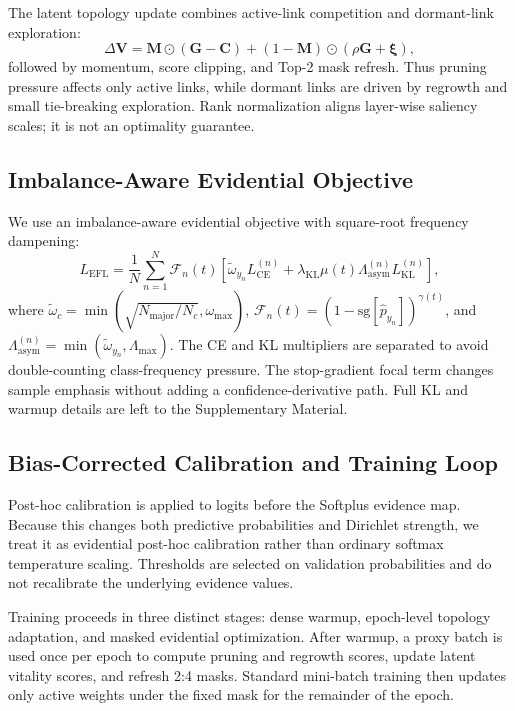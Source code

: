 \documentclass[letterpaper]{article} %
\begin{document}
The latent topology update combines active-link competition and dormant-link exploration:
\begin{equation}
    \Delta\bm{V}=\bm{M}\odot(\bm{G}-\bm{C})+(1-\bm{M})\odot(\rho\bm{G}+\bm{\xi}),
\end{equation}
followed by momentum, score clipping, and Top-2 mask refresh. Thus pruning pressure affects only active links, while dormant links are driven by regrowth and small tie-breaking exploration. Rank normalization aligns layer-wise saliency scales; it is not an optimality guarantee.

\subsection{Imbalance-Aware Evidential Objective}
We use an imbalance-aware evidential objective with square-root frequency dampening:
\begin{equation}
L_{\mathrm{EFL}}=\frac{1}{N}\sum_{n=1}^N\mathcal{F}_n(t)
\left[
\tilde{\omega}_{y_n}L_{\mathrm{CE}}^{(n)}
+\lambda_{\mathrm{KL}}\mu(t)\Lambda_{\mathrm{asym}}^{(n)}L_{\mathrm{KL}}^{(n)}
\right],
\end{equation}
where $\tilde{\omega}_{c}=\min(\sqrt{N_{\mathrm{major}}/N_c},\omega_{\max})$, $\mathcal{F}_n(t)=(1-\mathrm{sg}[\hat p_{y_n}])^{\gamma(t)}$, and $\Lambda_{\mathrm{asym}}^{(n)}=\min(\tilde{\omega}_{y_n},\Lambda_{\max})$. The CE and KL multipliers are separated to avoid double-counting class-frequency pressure. The stop-gradient focal term changes sample emphasis without adding a confidence-derivative path. Full KL and warmup details are left to the Supplementary Material.

\subsection{Bias-Corrected Calibration and Training Loop}
Post-hoc calibration is applied to logits before the Softplus evidence map. Because this changes both predictive probabilities and Dirichlet strength, we treat it as evidential post-hoc calibration rather than ordinary softmax temperature scaling. Thresholds are selected on validation probabilities and do not recalibrate the underlying evidence values.

Training proceeds in three distinct stages: dense warmup, epoch-level topology adaptation, and masked evidential optimization. After warmup, a proxy batch is used once per epoch to compute pruning and regrowth scores, update latent vitality scores, and refresh 2:4 masks. Standard mini-batch training then updates only active weights under the fixed mask for the remainder of the epoch.
\end{document}

